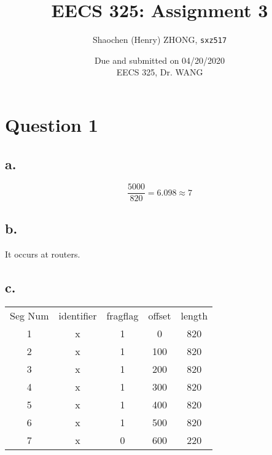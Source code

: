 \documentclass[12pt]{article}
\newcommand{\ilc}{\texttt}
\begin{document}
\title{\textbf{EECS 325: Assignment 3}}

\author{Shaochen (Henry) ZHONG, \ilc{sxz517} }
\date{Due and submitted on 04/20/2020 \\ EECS 325, Dr. WANG}
\maketitle

\section{Question 1}

\subsection{a.}

\begin{equation*}
    \frac{5000}{820} = 6.098 \approx 7
\end{equation*}

\subsection{b.}

It occurs at routers.

\subsection{c.}

\begin{table}[H]
\center
\begin{tabular}{ccccc}
\cline{1-1}
\multicolumn{1}{|c|}{Seg Num} & identifier & fragflag & offset & length \\ \cline{1-1}
1                                & x        & 1        & 0      & 820    \\
2                                & x        & 1        & 100    & 820    \\
3                                & x        & 1        & 200    & 820    \\
4                                & x        & 1        & 300    & 820    \\
5                                & x        & 1        & 400    & 820    \\
6                                & x        & 1        & 500    & 820    \\
7                                & x        & 0        & 600    & 220
\end{tabular}
\end{table}
\end{document}
